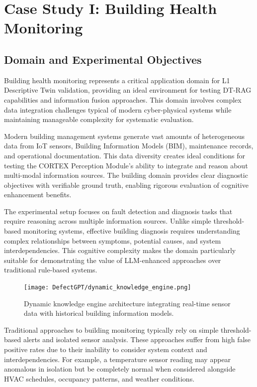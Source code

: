 
\chapter{Case Study I: Building Health Monitoring} \label{chp:building}

\section{Domain and Experimental Objectives}

Building health monitoring represents a critical application domain for L1 Descriptive Twin validation, providing an ideal environment for testing DT-RAG capabilities and information fusion approaches. This domain involves complex data integration challenges typical of modern cyber-physical systems while maintaining manageable complexity for systematic evaluation.

Modern building management systems generate vast amounts of heterogeneous data from IoT sensors, Building Information Models (BIM), maintenance records, and operational documentation. This data diversity creates ideal conditions for testing the CORTEX Perception Module's ability to integrate and reason about multi-modal information sources. The building domain provides clear diagnostic objectives with verifiable ground truth, enabling rigorous evaluation of cognitive enhancement benefits.

The experimental setup focuses on fault detection and diagnosis tasks that require reasoning across multiple information sources. Unlike simple threshold-based monitoring systems, effective building diagnosis requires understanding complex relationships between symptoms, potential causes, and system interdependencies. This cognitive complexity makes the domain particularly suitable for demonstrating the value of LLM-enhanced approaches over traditional rule-based systems.

\begin{figure}[htbp]
\centering
\texttt{[image: DefectGPT/dynamic\_knowledge\_engine.png]}
\caption{Dynamic knowledge engine architecture integrating real-time sensor data with historical building information models.}
\label{fig:dynamic_knowledge_engine}
\end{figure}

Traditional approaches to building monitoring typically rely on simple threshold-based alerts and isolated sensor analysis. These approaches suffer from high false positive rates due to their inability to consider system context and interdependencies. For example, a temperature sensor reading may appear anomalous in isolation but be completely normal when considered alongside HVAC schedules, occupancy patterns, and weather conditions.

